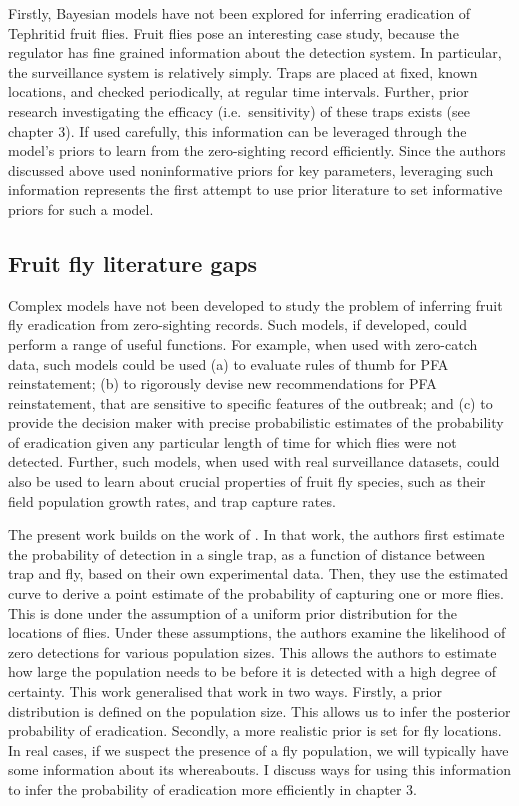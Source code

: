 \documentclass[
  oneside]{book}
\begin{document}
Firstly, Bayesian models have not been explored for inferring eradication of Tephritid fruit flies. Fruit flies pose an interesting case study, because the regulator has fine grained information about the detection system. In particular, the surveillance system is relatively simply. Traps are placed at fixed, known locations, and checked periodically, at regular time intervals. Further, prior research investigating the efficacy (i.e.~sensitivity) of these traps exists (see chapter 3). If used carefully, this information can be leveraged through the model's priors to learn from the zero-sighting record efficiently. Since the authors discussed above used noninformative priors for key parameters, leveraging such information represents the first attempt to use prior literature to set informative priors for such a model.

\hypertarget{fruit-fly-literature-gaps}{%
\subsection{Fruit fly literature gaps}\label{fruit-fly-literature-gaps}}

Complex models have not been developed to study the problem of inferring fruit fly eradication from zero-sighting records. Such models, if developed, could perform a range of useful functions. For example, when used with zero-catch data, such models could be used (a) to evaluate rules of thumb for PFA reinstatement; (b) to rigorously devise new recommendations for PFA reinstatement, that are sensitive to specific features of the outbreak; and (c) to provide the decision maker with precise probabilistic estimates of the probability of eradication given any particular length of time for which flies were not detected. Further, such models, when used with real surveillance datasets, could also be used to learn about crucial properties of fruit fly species, such as their field population growth rates, and trap capture rates.

The present work builds on the work of \citet{lance1994}. In that work, the authors first estimate the probability of detection in a single trap, as a function of distance between trap and fly, based on their own experimental data. Then, they use the estimated curve to derive a point estimate of the probability of capturing one or more flies. This is done under the assumption of a uniform prior distribution for the locations of flies. Under these assumptions, the authors examine the likelihood of zero detections for various population sizes. This allows the authors to estimate how large the population needs to be before it is detected with a high degree of certainty. This work generalised that work in two ways. Firstly, a prior distribution is defined on the population size. This allows us to infer the posterior probability of eradication. Secondly, a more realistic prior is set for fly locations. In real cases, if we suspect the presence of a fly population, we will typically have some information about its whereabouts. I discuss ways for using this information to infer the probability of eradication more efficiently in chapter 3.
\end{document}
